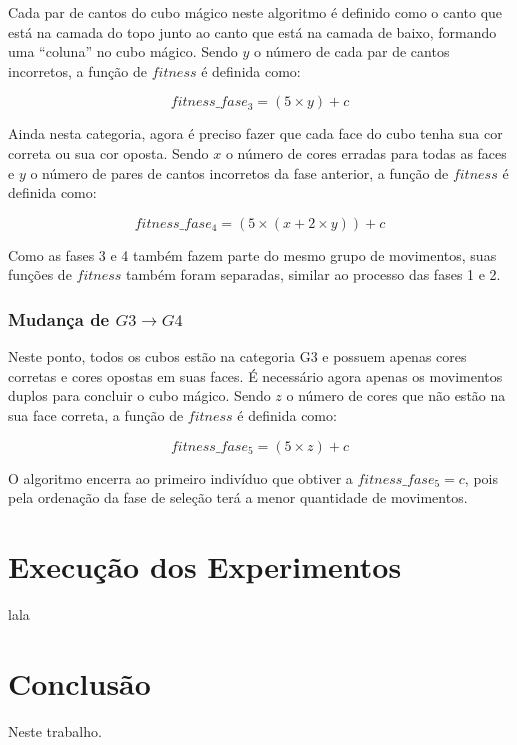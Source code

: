 \documentclass[12pt]{article}
\begin{document}
      Cada par de cantos do cubo mágico neste algoritmo é definido como o canto que está na camada do topo junto ao canto que está na camada de baixo, formando uma ``coluna'' no cubo mágico. Sendo $y$ o número de cada par de cantos incorretos, a função de $fitness$ é definida como:

      \begin{equation}
      fitness\_fase_3 = (5 \times y) + c
      \end{equation}

      Ainda nesta categoria, agora é preciso fazer que cada face do cubo tenha sua cor correta ou sua cor oposta. Sendo $x$ o número de cores erradas para todas as faces e $y$ o número de pares de cantos incorretos da fase anterior, a função de $fitness$ é definida como: 

      \begin{equation}
      fitness\_fase_4 = (5 \times (x + 2 \times y)) + c
      \end{equation}

      Como as fases 3 e 4 também fazem parte do mesmo grupo de movimentos, suas funções de $fitness$ também foram separadas, similar ao processo das fases 1 e 2.

    \subsubsection{Mudança de $G3 \to G4$}
      Neste ponto, todos os cubos estão na categoria G3 e possuem apenas cores corretas e cores opostas em suas faces. É necessário agora apenas os movimentos duplos para concluir o cubo mágico. Sendo $z$ o número de cores que não estão na sua face correta, a função de $fitness$ é definida como:

      \begin{equation}
      fitness\_fase_5 = (5 \times z) + c
      \end{equation}

      O algoritmo encerra ao primeiro indivíduo que obtiver a $fitness\_fase_5 = c$, pois
      pela ordenação da fase de seleção terá a menor quantidade de movimentos.

\section{Execução dos Experimentos}
  lala

\section{Conclusão}
  Neste trabalho.



\end{document}
